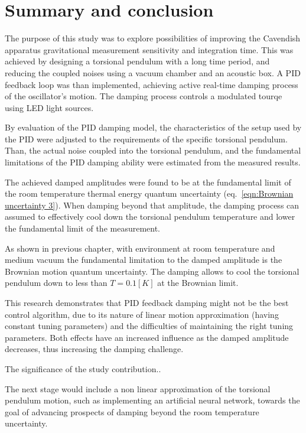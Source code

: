 \documentclass[\main/master.tex]{subfiles}
\begin{document}
\newspacing
\chapter{Summary and conclusion}\label{chapter:Summary and conclusion}
The purpose of this study was to explore possibilities of improving the Cavendish apparatus gravitational measurement sensitivity and integration time. This was achieved by designing a torsional pendulum with a long time period, and reducing the coupled noises using a vacuum chamber and an acoustic box. A PID feedback loop was than implemented, achieving active real-time damping process of the oscillator's motion. The damping process controls a modulated tourqe using LED light sources. 
\par\noindent
By evaluation of the PID damping model, the characteristics of the setup used by the PID were adjusted to the requirements of the specific torsional pendulum. Than, the actual noise coupled into the torsional pendulum, and the fundamental limitations of the PID damping ability were estimated from the measured results.
\par\noindent
The achieved damped amplitudes were found to be at the fundamental limit of the room temperature thermal energy quantum uncertainty (eq.~\ref{eqn:Brownian uncertainty 3}). When damping beyond that amplitude, the damping process can assumed to effectively cool down the torsional pendulum temperature and lower the fundamental limit of the measurement. 
\par\noindent
As shown in previous chapter, with environment at room temperature and medium vacuum the fundamental limitation to the damped amplitude is the Brownian motion quantum uncertainty. The damping allows to cool the torsional pendulum down to less than $T=0.1[K]$ at the Brownian limit.
\par\noindent
This research demonstrates that PID feedback damping might not be the best control algorithm, due to its nature of linear motion approximation (having constant tuning parameters) and the difficulties of maintaining the right tuning parameters. Both effects have an increased influence as the damped amplitude decreases, thus increasing the damping challenge.
\par\noindent
The significance of the study contribution..

\par\noindent
The next stage would include a non linear approximation of the torsional pendulum motion, such as implementing an artificial neural network, towards the goal of advancing prospects of damping beyond the room temperature uncertainty. 
\end{document}
